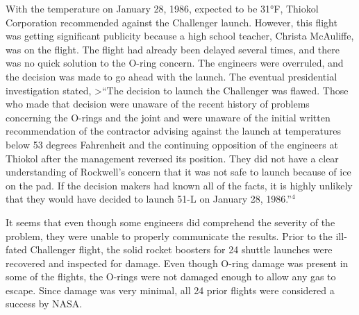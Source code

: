 \documentclass[
]{book}
\begin{document}
With the temperature on January 28, 1986, expected to be 31°F, Thiokol Corporation recommended
against the Challenger launch. However, this flight was getting significant publicity because a high school
teacher, Christa McAuliffe, was on the flight. The flight had already been delayed several times, and there
was no quick solution to the O-ring concern. The engineers were overruled, and the decision was made to go
ahead with the launch. The eventual presidential investigation stated,
\textgreater{}``The decision to launch the Challenger was flawed. Those who made that decision were unaware of
the recent history of problems concerning the O-rings and the joint and were unaware of the initial
written recommendation of the contractor advising against the launch at temperatures below 53
degrees Fahrenheit and the continuing opposition of the engineers at Thiokol after the management
reversed its position. They did not have a clear understanding of Rockwell's concern that it was not
safe to launch because of ice on the pad. If the decision makers had known all of the facts, it is highly
unlikely that they would have decided to launch 51-L on January 28, 1986.''\(^4\)

It seems that even though some engineers did comprehend the severity of the problem, they were unable
to properly communicate the results. Prior to the ill-fated Challenger flight, the solid rocket boosters for 24
shuttle launches were recovered and inspected for damage. Even though O-ring damage was present in some
of the flights, the O-rings were not damaged enough to allow any gas to escape. Since damage was very
minimal, all 24 prior flights were considered a success by NASA.
\end{document}
